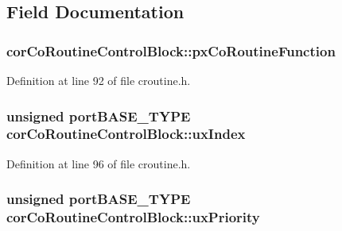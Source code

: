 \subsection{Field Documentation}
\hypertarget{structcor_co_routine_control_block_acc98c7364cd88e8e034a5f9bba113832}{
\subsubsection[{px\-Co\-Routine\-Function}]{ cor\-Co\-Routine\-Control\-Block\-::px\-Co\-Routine\-Function}}\label{structcor_co_routine_control_block_acc98c7364cd88e8e034a5f9bba113832}


Definition at line 92 of file croutine.\-h.

\hypertarget{structcor_co_routine_control_block_a9f4a873d7b5447f3677639080c8f5f51}{
\subsubsection[{ux\-Index}]{\setlength{\rightskip}{0pt plus 5cm}unsigned port\-B\-A\-S\-E\-\_\-\-T\-Y\-P\-E cor\-Co\-Routine\-Control\-Block\-::ux\-Index}}\label{structcor_co_routine_control_block_a9f4a873d7b5447f3677639080c8f5f51}


Definition at line 96 of file croutine.\-h.

\hypertarget{structcor_co_routine_control_block_af736666edff352eba690b3a5878bbdde}{
\subsubsection[{ux\-Priority}]{\setlength{\rightskip}{0pt plus 5cm}unsigned port\-B\-A\-S\-E\-\_\-\-T\-Y\-P\-E cor\-Co\-Routine\-Control\-Block\-::ux\-Priority}}\label{structcor_co_routine_control_block_af736666edff352eba690b3a5878bbdde}


